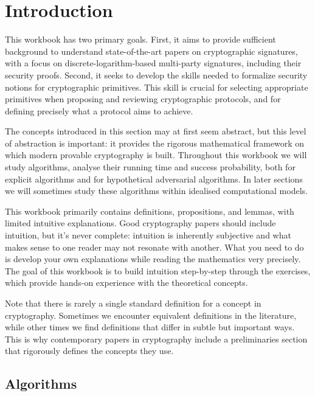 \section{Introduction}\label{sec:intro}

This workbook has two primary goals.
First, it aims to provide sufficient background to understand state-of-the-art papers on cryptographic signatures, with a focus on discrete-logarithm-based multi-party signatures, including their security proofs.
Second, it seeks to develop the skills needed to formalize security notions for cryptographic primitives.
This skill is crucial for selecting appropriate primitives when proposing and reviewing cryptographic protocols, and for defining precisely what a protocol aims to achieve.

The concepts introduced in this section may at first seem abstract, but this level of abstraction is important: it provides the rigorous mathematical framework on which modern provable cryptography is built.
Throughout this workbook we will study algorithms, analyse their running time and success probability, both for explicit algorithms and for hypothetical adversarial algorithms.
In later sections we will sometimes study these algorithms within idealised computational models.

This workbook primarily contains definitions, propositions, and lemmas, with limited intuitive explanations.
Good cryptography papers should include intuition, but it's never complete: intuition is inherently subjective and what makes sense to one reader may not resonate with another.
What you need to do is develop your own explanations while reading the mathematics very precisely.
The goal of this workbook is to build intuition step-by-step through the exercises, which provide hands-on experience with the theoretical concepts.

Note that there is rarely a single standard definition for a concept in cryptography.
Sometimes we encounter equivalent definitions in the literature, while other times we find definitions that differ in subtle but important ways.
This is why contemporary papers in cryptography include a preliminaries section that rigorously defines the concepts they use.


\subsection{Algorithms}

